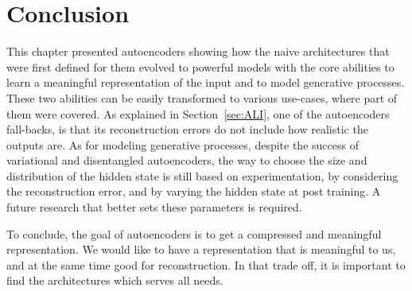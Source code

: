 \documentclass[graybox]{svmult}
\begin{document}
\section{Conclusion}
\label{sec:Conclusions and open problems}
This chapter presented autoencoders showing how the naive architectures that were first defined for them evolved to powerful models with the core abilities to learn a meaningful representation of the input and to model generative processes. These two abilities can be easily transformed to various use-cases,  where part of them were covered.
As explained in Section~\ref{sec:ALI}, one of the autoencoders fall-backs, is that its reconstruction errors do not include how realistic the outputs are.
As for modeling generative processes, despite the success of variational and disentangled autoencoders, the way to choose the size and distribution of the hidden state is still based on experimentation, by considering the reconstruction error, and by varying the hidden state at post training. A future research that better sets these parameters is required.

To conclude, the goal of autoencoders is to get a compressed and meaningful representation. We would like to have a representation that is meaningful to us, and at the same time good for reconstruction. In that trade off, it is important to find the architectures which serves all needs.




\end{document}
